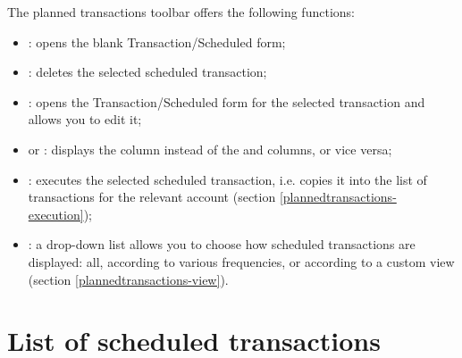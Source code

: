 The planned transactions toolbar offers the following functions:
\begin{itemize}
	\item {}: opens the blank Transaction/Scheduled form;
	\item {}: deletes the selected scheduled transaction;
	\item {}: opens the Transaction/Scheduled form for the selected transaction and allows you to edit it;
	\item {} or : displays the  column instead of the  and  columns, or vice versa;
	\item {}: executes the selected scheduled transaction, i.e. copies it into the list of transactions for the relevant account (section \vref{plannedtransactions-execution});
	\item {}: a drop-down list allows you to choose how scheduled transactions are displayed: all, according to various frequencies, or according to a custom view (section \vref{plannedtransactions-view}).
\end{itemize}


\section{List of scheduled transactions\label{plannedtransactions-list}}


